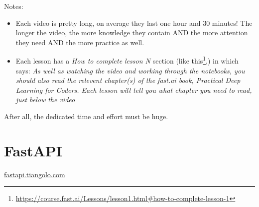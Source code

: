 		
		
		\noindent Notes:
		\begin{itemize}
			\item Each video is pretty long, on average they last one hour and 30 minutes! The longer the video, the more knowledge they contain AND the more attention they need AND the more practice as well.
			
			\item Each lesson has a \textit{How to complete lesson N} section (like this\footnote{\url{https://course.fast.ai/Lessons/lesson1.html\#how-to-complete-lesson-1}},) in which says: \textit{As well as watching the video and working through the notebooks, you should also read the relevent chapter(s) of the fast.ai book, Practical Deep Learning for Coders. Each lesson will tell you what chapter you need to read, just below the video}
		\end{itemize}
		
		After all, \textsf{the dedicated time and effort must be huge.}
		
		\clearpage
		\section{FastAPI}
		\epigraph{
			\begin{sansserif}
			\end{sansserif}	
		}{\url{fastapi.tiangolo.com}}
		
		\begin{inparadesc}
			\item \easy
			\item \shortvideo
			\item \many
		\end{inparadesc}
		\vspace{3mm}
		
		
